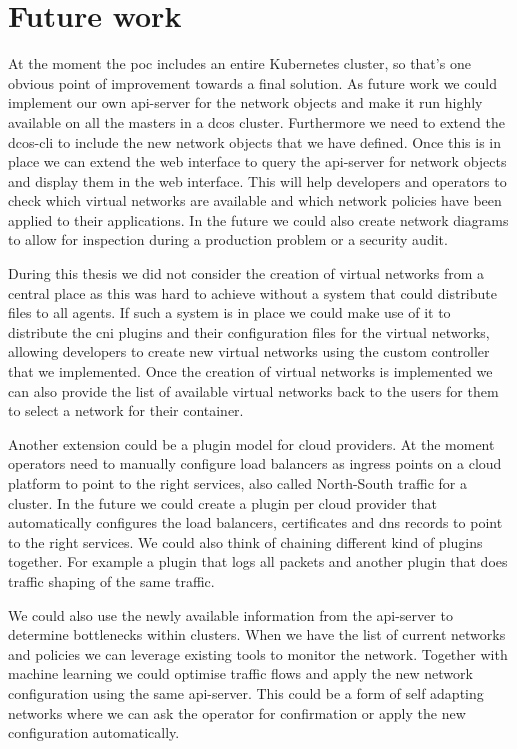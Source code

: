 \chapter{Future work}
\label{chap:future-work}
At the moment the \gls{poc} includes an entire Kubernetes cluster, so that's one obvious point of improvement towards a final solution. As future work we could implement our own api-server for the network objects and make it run highly available on all the masters in a \gls{dcos} cluster. Furthermore we need to extend the dcos-cli to include the new network objects that we have defined. Once this is in place we can extend the web interface to query the api-server for network objects and display them in the web interface. This will help developers and operators to check which virtual networks are available and which network policies have been applied to their applications. In the future we could also create network diagrams to allow for inspection during a production problem or a security audit.

During this thesis we did not consider the creation of virtual networks from a central place as this was hard to achieve without a system that could distribute files to all agents. If such a system is in place we could make use of it to distribute the \gls{cni} plugins and their configuration files for the virtual networks, allowing developers to create new virtual networks using the custom controller that we implemented. Once the creation of virtual networks is implemented we can also provide the list of available virtual networks back to the users for them to select a network for their container.

Another extension could be a plugin model for cloud providers. At the moment operators need to manually configure load balancers as ingress points on a cloud platform to point to the right services, also called North-South traffic for a cluster. In the future we could create a plugin per cloud provider that automatically configures the load balancers, certificates and \gls{dns} records to point to the right services. We could also think of chaining different kind of plugins together. For example a plugin that logs all packets and another plugin that does traffic shaping of the same traffic.

We could also use the newly available information from the api-server to determine bottlenecks within clusters. When we have the list of current networks and policies we can leverage existing tools to monitor the network. Together with machine learning we could optimise traffic flows and apply the new network configuration using the same api-server. This could be a form of self adapting networks where we can ask the operator for confirmation or apply the new configuration automatically.
